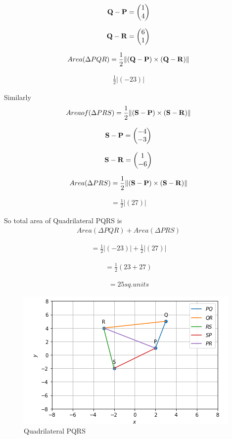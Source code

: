\documentclass[journal,12pt,twocolumn]{IEEEtran}
\begin{document}
\begin{align}
\mathbf{Q-P}=\begin{pmatrix}1\\4\end{pmatrix}
\end{align}

\begin{align}
\mathbf{Q-R}=\begin{pmatrix}6\\1\end{pmatrix}
\end{align}


\begin{align}
Area (\Delta PQR)=
\frac{1}{2}\lVert\mathbf{(\mathbf{Q}-\mathbf{P})\times(\mathbf{Q}-\mathbf{R})}\rVert
\end{align}

\begin{align}
\frac{1}{2}\left|(-23)\right|
\end{align}

Similarly 
\begin{align}
Area of (\Delta PRS)=
\frac{1}{2}\lVert\mathbf{(\mathbf{S}-\mathbf{P})\times(\mathbf{S}-\mathbf{R})}\rVert
\end{align}

\begin{align}
\mathbf{S-P}=\begin{pmatrix}-4\\-3\end{pmatrix}
\end{align}

\begin{align}
\mathbf{S-R}=\begin{pmatrix}1\\-6\end{pmatrix}
\end{align}

\begin{align}
Area (\Delta PRS)=
\frac{1}{2}\lVert\mathbf{(\mathbf{S}-\mathbf{P})\times(\mathbf{S}-\mathbf{R})}\rVert
\end{align}

\begin{align}
=\frac{1}{2}|(27)|    
\end{align}

So total area of Quadrilateral PQRS is 
\begin{align}
Area (\Delta PQR)+Area (\Delta PRS)
\end{align}

\begin{align}
=\frac{1}{2}|(-23)|+\frac{1}{2}|(27)|
\end{align}

\begin{align}
=\frac{1}{2}(23+27)
\end{align}

\begin{align}
=25 sq.units
\end{align}

\begin{figure}[!ht]
    \centering
    \includegraphics[width=\columnwidth]{QUAD.PNG}
    \caption{Quadrilateral PQRS}
    \label{fig:Quad PQRS}
\end{figure}
\end{document}
